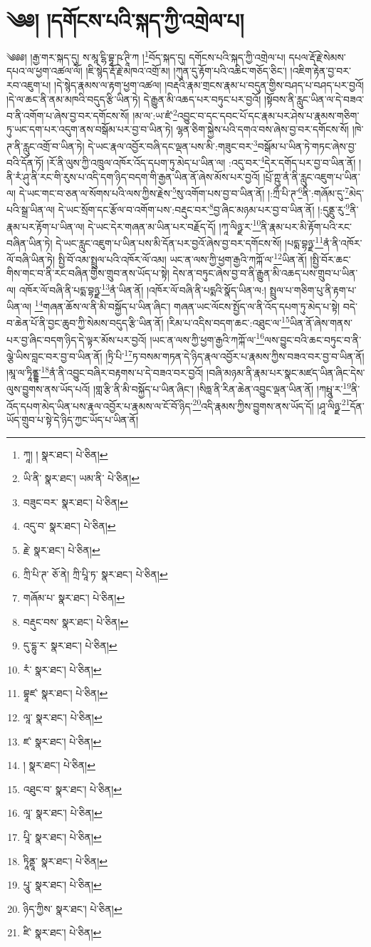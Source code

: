 \setcounter{footnote}{0} 
\chapter{༄༅། །དགོངས་པའི་སྐད་ཀྱི་འགྲེལ་པ།}༄༅༅། །རྒྱ་གར་སྐད་དུ། ས་མཱ་ངྷི་བྷཱ་ཥ་ཊཱི་ཀ །\footnote{ཀཱ། །  སྣར་ཐང་།  པེ་ཅིན། }བོད་སྐད་དུ། དགོངས་པའི་སྐད་ཀྱི་འགྲེལ་པ། དཔལ་རྡོ་རྗེ་སེམས་དཔའ་ལ་ཕྱག་འཚལ་ལོ། །ཇི་སྙེད་རྡོ་རྗེ་མཁའ་འགྲོ་མ། །ཀུན་དུ་རྟོག་པའི་འཆིང་གཅོད་ཅིང་། །འཇིག་རྟེན་བྱ་བར་རབ་འཇུག་པ། །དེ་སྙེད་རྣམས་ལ་རྟག་ཕྱག་འཚལ། །བརྡའི་རྣམ་གྲངས་རྣམ་པ་བདུན་གྱིས་བཤད་པ་བཤད་པར་བྱའོ། །དེ་ལ་ཆང་ནི་ནམ་མཁའི་བདུད་རྩི་ཡིན་ཏེ། དེ་རྒྱུན་མི་འཆད་པར་བཏུང་པར་བྱའོ། །སྟོབས་ནི་རླུང་ཡིན་ལ་དེ་བཟའ་བ་ནི་འགོག་པ་ཞེས་བྱ་བར་དགོངས་སོ། །མ་ལ་:ཡ་ཛཾ་\footnote{ཡི་ནི་  སྣར་ཐང་། ཡམ་ནི་  པེ་ཅིན། }འབྱུང་བ་དང་དབང་པོ་དང་རྣམ་པར་ཤེས་པ་རྣམས་གཅིག་ཏུ་ཡང་དག་པར་འདུག་ནས་བསྒོམ་པར་བྱ་བ་ཡིན་ཏེ། ལྷན་ཅིག་སྐྱེས་པའི་དགའ་བས་ཞེས་བྱ་བར་དགོངས་སོ། །ཁེ་ཊ་ནི་རླུང་འགྲོ་བ་ཡིན་ཏེ། དེ་ཡང་རྣལ་འབྱོར་བཞི་དང་ལྡན་པས་མི་:གཟུང་བར་\footnote{བཟུང་བར་  སྣར་ཐང་།  པེ་ཅིན། }བསྒོམ་པ་ཡིན་ཏེ་གཏང་ཞེས་བྱ་བའི་དོན་ཏོ། །རོ་ནི་ལུས་ཀྱི་འཁྲུལ་འཁོར་འོད་དཔག་ཏུ་མེད་པ་ཡིན་ལ། :འདུ་བར་\footnote{འདུ་བ་  སྣར་ཐང་།  པེ་ཅིན། }དེར་དགོད་པར་བྱ་བ་ཡིན་ནོ། །ནི་རཾ་ཤུ་ནི་རང་གི་རུས་པ་འདི་དག་ཉིད་བདག་གི་རྒྱན་ཡིན་ནོ་ཞེས་མོས་པར་བྱའོ། །པྲོ་ཀྵུ་ནཾ་ནི་རླུང་འཇུག་པ་ཡིན་ལ། དེ་ཡང་གང་བ་ཅན་ལ་སོགས་པའི་ལས་ཀྱིས་རྗེས་\footnote{རྗེ་  སྣར་ཐང་།  པེ་ཅིན། }སུ་འགོག་པས་བྱ་བ་ཡིན་ནོ། །:ཀྲྀ་པི་ཊ་\footnote{ཀྲི་པི་ཊ་  ཅོ་ནེ། ཀྲི་པཱི་ཏ་  སྣར་ཐང་།  པེ་ཅིན། }ནི་:གཞོམ་དུ་\footnote{གཞོམ་པ་  སྣར་ཐང་།  པེ་ཅིན། }མེད་པའི་སྒྲ་ཡིན་ལ། དེ་ཡང་སྲོག་དང་རྩོལ་བ་འགོག་པས་:བརྡུང་བར་\footnote{བརྡུང་བས་  སྣར་ཐང་།  པེ་ཅིན། }བྱ་ཞིང་མཉམ་པར་བྱ་བ་ཡིན་ནོ། །:དུནྡུ་རུ་\footnote{དུ་དྷུ་ར་  སྣར་ཐང་།  པེ་ཅིན། }ནི་རྣམ་པར་རྟོག་པ་ཡིན་ལ། དེ་ཡང་དེར་གཞན་མ་ཡིན་པར་བརྗོད་དོ། །ཀཱ་ལིཉྫ་ར་\footnote{རཾ་  སྣར་ཐང་།  པེ་ཅིན། }ནི་རྣམ་པར་མི་རྟོག་པའི་རང་བཞིན་ཡིན་ཏེ། དེ་ཡང་རླུང་འཇུག་པ་ཡིན་པས་མི་དོན་པར་བྱའོ་ཞེས་བྱ་བར་དགོངས་སོ། །པདྨ་བྷཉྫ་\footnote{བྷཱཛ་  སྣར་ཐང་།  པེ་ཅིན། }ནཾ་ནི་འཁོར་ལོ་བཞི་ཡིན་ཏེ། སྤྱི་བོ་འམ་སྤྲུལ་པའི་འཁོར་ལོ་འམ། ཡང་ན་ལས་ཀྱི་ཕྱག་རྒྱའི་ཀཀྐོ་ལ་\footnote{ལཱ་  སྣར་ཐང་།  པེ་ཅིན། }ཡིན་ནོ། །སྤྱི་བོར་ཆང་གིས་གང་བ་ནི་རང་བཞིན་གྱིས་གྲུབ་ནས་ཡོད་པ་སྟེ། དེས་ན་བཏུང་ཞེས་བྱ་བ་ནི་རྒྱུན་མི་འཆད་པས་གྲུབ་པ་ཡིན་ལ། འཁོར་ལོ་བཞི་ནི་པདྨ་བྷཉྫ་\footnote{ཛ་  སྣར་ཐང་།  པེ་ཅིན། }ནཾ་ཡིན་ནོ། །འཁོར་ལོ་བཞི་ནི་པདྨའི་སྣོད་ཡིན་ལ:། སྤྲུལ་པ་གཅིག་པུ་ནི་རྟག་པ་ཡིན་ལ། \footnote{།    སྣར་ཐང་།  པེ་ཅིན། }གཞན་ཆོས་ལ་ནི་མི་བསྐྱོད་པ་ཡིན་ཞིང་། གཞན་ཡང་ལོངས་སྤྱོད་ལ་ནི་འོད་དཔག་ཏུ་མེད་པ་སྟེ། བདེ་བ་ཆེན་པོ་ནི་བྱང་ཆུབ་ཀྱི་སེམས་བདུད་རྩི་ཡིན་ནོ། །རིམ་པ་འདིས་བདག་ཆང་:འཐུང་ལ་\footnote{འཐུང་བ་  སྣར་ཐང་།  པེ་ཅིན། }ཡིན་ནོ་ཞེས་གནས་པར་བྱ་ཞིང་བདག་ཉིད་དེ་ལྟར་མོས་པར་བྱའོ། །ཡང་ན་ལས་ཀྱི་ཕྱག་རྒྱའི་ཀཀྐོ་ལ་\footnote{ལཱ་  སྣར་ཐང་།  པེ་ཅིན། }ལས་བྱུང་བའི་ཆང་བཏུང་བ་ནི་ལྕེ་ཡིས་བླང་བར་བྱ་བ་ཡིན་ནོ། །ཏྲི་པི་\footnote{པཱི་  སྣར་ཐང་།  པེ་ཅིན། }ཏ་བསམ་གཏན་དེ་ཉིད་རྣལ་འབྱོར་པ་རྣམས་ཀྱིས་བཟའ་བར་བྱ་བ་ཡིན་ནོ། །མཱ་ལ་ཏཱིནྡྷ་\footnote{ཏཱིནྡཱ་  སྣར་ཐང་།  པེ་ཅིན། }ནཾ་ནི་འབྱུང་བཞིར་བརྟགས་པ་དེ་བཟའ་བར་བྱའོ། །བཞི་མཉམ་ནི་རྣམ་པར་སྣང་མཛད་ཡིན་ཞིང་དེས་ལུས་བྱུགས་ནས་ཡོད་པའོ། །གླ་རྩི་ནི་མི་བསྐྱོད་པ་ཡིན་ཞིང་། །སིཧླ་ནི་རིན་ཆེན་འབྱུང་ལྡན་ཡིན་ནོ། །ཀཔྤཱུ་ར་\footnote{པཱུ་  སྣར་ཐང་།  པེ་ཅིན། }ནི་འོད་དཔག་མེད་ཡིན་པས་རྣལ་འབྱོར་པ་རྣམས་ལ་ངོ་བོ་ཉིད་\footnote{ཉིད་ཀྱིས་  སྣར་ཐང་།  པེ་ཅིན། }འདི་རྣམས་ཀྱིས་བྱུགས་ནས་ཡོད་དོ། །ཤཱ་ལིཉྫ་\footnote{ཛི་  སྣར་ཐང་།  པེ་ཅིན། }དོན་ཡོད་གྲུབ་པ་སྟེ་དེ་ཉིད་ཀྱང་ཡོད་པ་ཡིན་ནོ། 